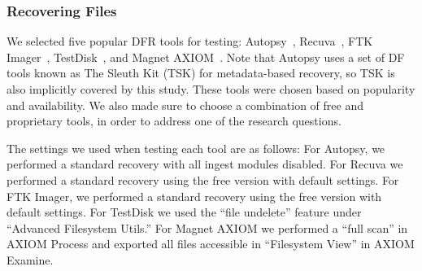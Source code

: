 \documentclass{ws-rv9x6}
\newenvironment{paraphrase}{\color{blue}}{\color{black}} %
\begin{document}
\subsubsection{Recovering Files}
\begin{paraphrase}
 We selected five popular DFR tools for testing: Autopsy~\cite{autopsy}, Recuva~\cite{recuva}, FTK Imager~\cite{ftk}, TestDisk~\cite{testdisk}, and Magnet AXIOM~\cite{axiom}. 
Note that Autopsy uses a set of DF tools known as The Sleuth Kit (TSK) for metadata-based recovery, so TSK is also implicitly covered by this study. 
These tools were chosen based on popularity and availability.
We also made sure to choose a combination of free and proprietary tools, in order to address one of the research questions.

The settings we used when testing each tool are as follows:
For Autopsy, we performed a standard recovery with all ingest modules disabled.
For Recuva we performed a standard recovery using the free version with default settings.
For FTK Imager, we performed a standard recovery using the free version with default settings.
For TestDisk we used the ``file undelete'' feature under ``Advanced Filesystem Utils.''
For Magnet AXIOM we performed a ``full scan'' in AXIOM Process and exported all files accessible in ``Filesystem View'' in AXIOM Examine.
\end{paraphrase}
\end{document}
